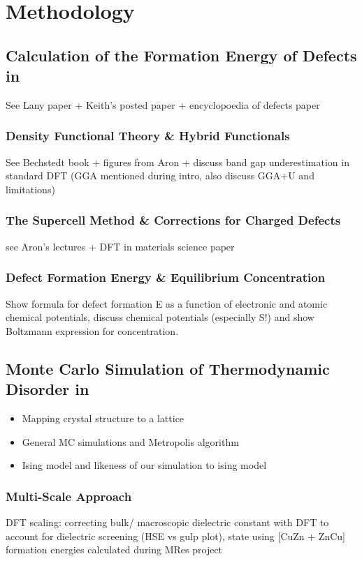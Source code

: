 \chapter{Methodology}

\section{Calculation of the Formation Energy of Defects in \CZTS}
See Lany paper + Keith's posted paper + encyclopoedia of defects paper 


\subsection{Density Functional Theory \& Hybrid Functionals}\label{DFT_section}
See Bechstedt book \cite{Bechstedt} + figures from Aron + discuss band gap underestimation in standard DFT (GGA mentioned during intro, also discuss GGA+U and limitations)

\subsection{The Supercell Method \& Corrections for Charged Defects}\label{supercell_section}
see Aron's lectures + DFT in materials science paper \cite{DFT_in_mat}


\subsection{Defect Formation Energy \& Equilibrium Concentration}
Show formula for defect formation E as a function of electronic and atomic chemical potentials, discuss chemical potentials (especially S!) and show Boltzmann expression for concentration.



\section{Monte Carlo Simulation of Thermodynamic Disorder in \CZTS}
\begin{itemize}
\item Mapping crystal structure to a lattice
\item General MC simulations and Metropolis algorithm
\item Ising model and likeness of our simulation to ising model
\end{itemize}

\subsection{Multi-Scale Approach}
DFT scaling: correcting bulk/ macroscopic dielectric constant with DFT to account for dielectric screening (HSE vs gulp plot), state using [CuZn + ZnCu] formation energies calculated during MRes project

